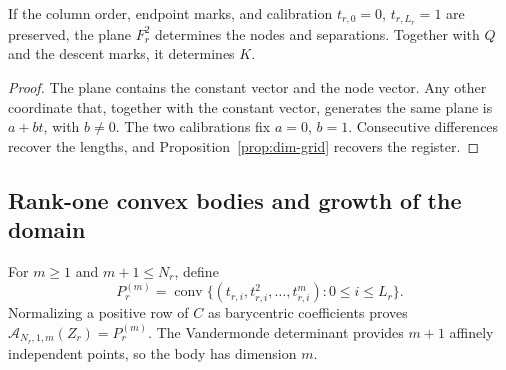 \begin{proposition}
If the column order, endpoint marks, and calibration
\(t_{r,0}=0\), \(t_{r,L_r}=1\) are preserved, the plane \(F_r^2\)
determines the nodes and separations. Together with \(Q\) and the
descent marks, it determines \(K\).
\end{proposition}
\begin{proof}
The plane contains the constant vector and the node vector. Any other
coordinate that, together with the constant vector, generates the same
plane is \(a+bt\), with \(b\neq0\). The two calibrations fix
\(a=0\), \(b=1\). Consecutive differences recover the lengths,
and Proposition~\ref{prop:dim-grid} recovers the register.
\end{proof}

\subsection{Rank-one convex bodies and growth of the domain}

For \(m\geq1\) and \(m+1\leq N_r\), define
\[
 P_r^{(m)}=\operatorname{conv}
 \{(t_{r,i},t_{r,i}^2,\ldots,t_{r,i}^m):0\leq i\leq L_r\}.
\]
Normalizing a positive row of \(C\) as barycentric coefficients proves
\(\mathcal A_{N_r,1,m}(Z_r)=P_r^{(m)}\). The Vandermonde
determinant provides \(m+1\) affinely independent points, so the
body has dimension \(m\).

